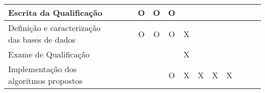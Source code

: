 \begin{table}[!htp]
\begin{threeparttable}[b]
\begin{tabular}{|p{3.1cm}|c|c|c|c|c|c|c|c|c|c|c|c|c|}
Escrita da Qualificação                       &                                                 &                                                 &                                                & O                                               & O                                               & O                                               &                                                 &                                                 &                                                 &                                                 &                                                 &                                                 &                                                 \\ \hline
Definição e caracterização das bases de dados &                                                 &                                                 &                                                 & O                                               & O                                               & O                                               & X                                                &                                                 &                                                 &                                                 &                                                 &                                                 &                                                 \\ \hline
Exame de Qualificação                         &                                                 &                                                 &                                                 &                                                 &                                                 &                                                 & X                                               &                                                 &                                                 &                                                 &                                                 &                                                 &                                                 \\ \hline
Implementação dos algoritmos propostos        &                                                 &                                                 &                                                 &                                                 &                                                 & O                                               & X                                               & X                                               & X                                               & X                                               &                                                 &                                                 &                                                 \\ \hline

\end{tabular}
\end{threeparttable}
\end{table}
